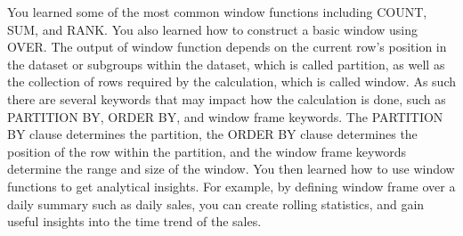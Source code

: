 You learned some of the most common window functions including COUNT, SUM, and RANK. You also learned how to construct a basic window using OVER. The output of window function depends on the current row's position in the dataset or subgroups within the dataset, which is called partition, as well as the collection of rows required by the calculation, which is called window. As such there are several keywords that may impact how the calculation is done, such as PARTITION BY, ORDER BY, and window frame keywords. The PARTITION BY clause determines the partition, the ORDER BY clause determines the position of the row within the partition, and the window frame keywords determine the range and size of the window. You then learned how to use window functions to get analytical insights. For example, by defining window frame over a daily summary such as daily sales, you can create rolling statistics, and gain useful insights into the time trend of the sales.
